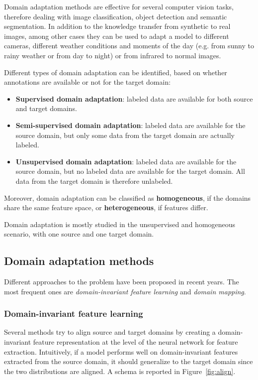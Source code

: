 \documentclass[%
    corpo=12pt,
    twoside,
    stile=classica,   
    tipotesi=magistrale,
    evenboxes,
    english,
	numerazioneromana,
]{toptesi}
\begin{document}
\bigskip
Domain adaptation methods are effective for several computer vision tasks, therefore dealing with image classification, object detection and semantic segmentation. In addition to the knowledge transfer from synthetic to real images, among other cases they can be used to adapt a model to different cameras, different weather conditions and moments of the day (e.g. from sunny to rainy weather or from day to night) or from infrared to normal images.

Different types of domain adaptation can be identified, based on whether annotations are available or not for the target domain:

\begin{itemize}
	\item \textbf{Supervised domain adaptation}: labeled data are available for both source and target domains.
	\item \textbf{Semi-supervised domain adaptation}: labeled data are available for the source domain, but only some data from the target domain are actually labeled.
	\item \textbf{Unsupervised domain adaptation}: labeled data are available for the source domain, but no labeled data are available for the target domain. All data from the target domain is therefore unlabeled.
\end{itemize}
Moreover, domain adaptation can be classified as \textbf{homogeneous}, if the domains share the same feature space, or \textbf{heterogeneous}, if features differ.

\medskip
Domain adaptation is mostly studied in the unsupervised and homogeneous scenario, with one source and one target domain.

\subsection{Domain adaptation methods}
Different approaches to the problem have been proposed in recent years. The most frequent ones are \textit{domain-invariant feature learning} and \textit{domain mapping}.

\subsubsection{Domain-invariant feature learning}
Several methods try to align source and target domains by creating a domain-invariant feature representation at the level of the neural network for feature extraction. Intuitively, if a model performs well on domain-invariant features extracted from the source domain, it should generalize to the target domain since the two distributions are aligned. A schema is reported in Figure~\ref{fig:align}.
\end{document}

